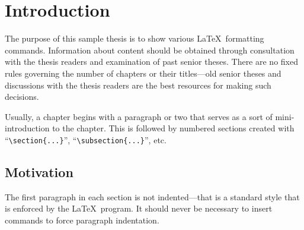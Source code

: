 %
%

\chapter{Introduction}\label{ch:intro} %


The purpose of this sample thesis is to show various \LaTeX\ formatting
commands. Information about content should be obtained through consultation
with the thesis readers and examination of past senior theses.
There are no fixed rules governing the number of chapters or their titles---old 
senior theses and discussions with the thesis readers are the best resources
for making such decisions.

Usually, a chapter begins with a paragraph or two that serves as a
sort of mini-introduction to the chapter. This is followed 
by numbered sections created with ``\verb$\section{...}$'', 
``\verb$\subsection{...}$'', etc.

\section{Motivation} \label{sec:motivation}
The first paragraph in each section is not indented---that is a standard style
that is enforced by the \LaTeX\ program. It should never be necessary to
insert commands to force paragraph indentation.

